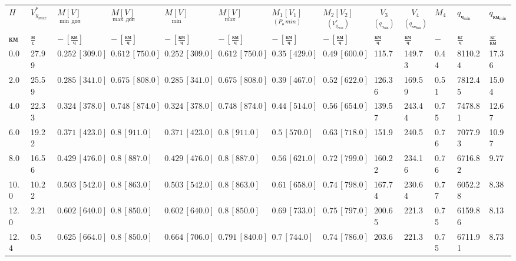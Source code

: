 \begin{tabular}{lllllllllllll}
$H$ & $V_{y_{max}}^*$ & $\underset{\min \, доп}{M [V]}$ & $\underset{\max \, доп}{M [V]}$ & $\underset{\min}{M [V]}$ & $\underset{\max}{M [V]}$ & $\underset{(P_п\, min)}{M_1 [V_1]}$ & $\underset{(V_{y_{max}}^*)}{M_2 [V_2]}$ & $\underset{(q_{ч_{\min}})}{V_3}$ & $\underset{(q_{{км}_{\min}})}{V_4}$ & $M_4$ & $q_{ч_{\min}}$ & $q_{{км}_{\min}}$ \\
$км$ & $\frac{м}{с}$ & $-\,[\frac{км}{ч}]$ & $-\,[\frac{км}{ч}]$ & $-\,[\frac{км}{ч}]$ & $-\,[\frac{км}{ч}]$ & $-\,[\frac{км}{ч}]$ & $-\,[\frac{км}{ч}]$ & $\frac{км}{ч}$ & $\frac{км}{ч}$ & $-$ & $\frac{кг}{ч}$ & $\frac{кг}{км}$ \\
0.0 & 27.99 & $0.252\, [309.0]$ & $0.612\, [750.0]$ & $0.252\, [309.0]$ & $0.612\, [750.0]$ & $0.35\, [429.0]$ & $0.49\, [600.0]$ & 115.7 & 149.73 & 0.44 & 8110.24 & 17.36 \\
2.0 & 25.59 & $0.285\, [341.0]$ & $0.675\, [808.0]$ & $0.285\, [341.0]$ & $0.675\, [808.0]$ & $0.39\, [467.0]$ & $0.52\, [622.0]$ & 126.36 & 169.59 & 0.51 & 7812.45 & 15.04 \\
4.0 & 22.33 & $0.324\, [378.0]$ & $0.748\, [874.0]$ & $0.324\, [378.0]$ & $0.748\, [874.0]$ & $0.44\, [514.0]$ & $0.56\, [654.0]$ & 139.57 & 243.44 & 0.75 & 7478.81 & 12.67 \\
6.0 & 19.22 & $0.371\, [423.0]$ & $0.8\, [911.0]$ & $0.371\, [423.0]$ & $0.8\, [911.0]$ & $0.5\, [570.0]$ & $0.63\, [718.0]$ & 151.9 & 240.5 & 0.76 & 7077.93 & 10.97 \\
8.0 & 16.56 & $0.429\, [476.0]$ & $0.8\, [887.0]$ & $0.429\, [476.0]$ & $0.8\, [887.0]$ & $0.56\, [621.0]$ & $0.72\, [799.0]$ & 160.22 & 234.16 & 0.76 & 6716.82 & 9.77 \\
10.0 & 10.22 & $0.503\, [542.0]$ & $0.8\, [863.0]$ & $0.503\, [542.0]$ & $0.8\, [863.0]$ & $0.61\, [658.0]$ & $0.74\, [798.0]$ & 167.74 & 230.64 & 0.77 & 6052.28 & 8.38 \\
12.0 & 2.21 & $0.602\, [640.0]$ & $0.8\, [850.0]$ & $0.602\, [640.0]$ & $0.8\, [850.0]$ & $0.69\, [733.0]$ & $0.75\, [797.0]$ & 200.65 & 221.3 & 0.75 & 6159.86 & 8.13 \\
12.4 & 0.5 & $0.625\, [664.0]$ & $0.8\, [850.0]$ & $0.664\, [706.0]$ & $0.791\, [840.0]$ & $0.7\, [744.0]$ & $0.74\, [786.0]$ & 203.6 & 221.3 & 0.75 & 6711.91 & 8.73 \\
\end{tabular}
